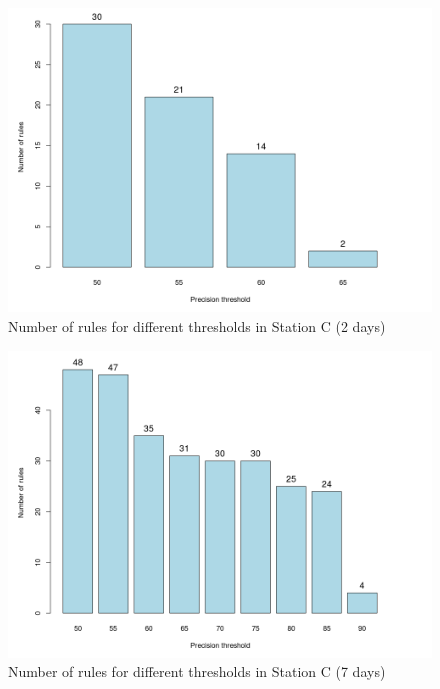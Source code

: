 \begin{figure}[hbtp]
\includegraphics[width=\textwidth]{img/precision_seg2.png}
\caption{Number of rules for different thresholds in Station C (2 days)} \label{fig:precision_seg2}
\end{figure}

\begin{figure}[hbtp]
\includegraphics[width=\textwidth]{img/precision_seg7.png}
\caption{Number of rules for different thresholds in Station C (7 days)} \label{fig:precision_seg7}
\end{figure}

